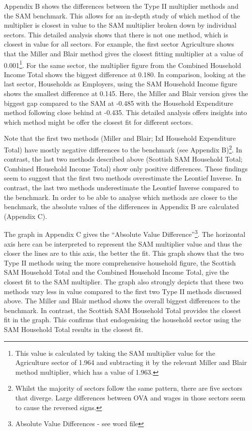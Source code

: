 \begin{doublespacing}
Appendix B shows the differences between the Type II multiplier methods and the SAM benchmark. This allows for an in-depth study of which method of the multiplier is closest in value to the SAM multiplier broken down by individual sectors. This detailed analysis shows that there is not one method, which is closest in value for all sectors. For example, the first sector Agriculture shows that the Miller and Blair \cite{Miller2009} method gives the closest fitting multiplier at a value of 0.001\footnote{This value is calculated by taking the SAM multiplier value for the Agriculture sector of 1.964 and subtracting it by the relevant Miller and Blair method multiplier, which has a value of 1.963.}. For the same sector, the multiplier figure from the Combined Household Income Total shows the biggest difference at 0.180. In comparison, looking at the last sector, Households as Employers, using the SAM Household Income figure shows the smallest difference at 0.145. Here, the Miller and Blair \cite{Miller2009} version gives the biggest gap compared to the SAM at -0.485 with the Household Expenditure method following close behind at -0.435. This detailed analysis offers insights into which method might be offer the closest fit for different sectors. 

\bigskip

Note that the first two methods (Miller and Blair; IxI Household Expenditure Total) have mostly negative differences to the benchmark (see Appendix B)\footnote{Whilst the majority of sectors follow the same pattern, there are five sectors that diverge. Large differences between OVA and wages in those sectors seem to cause the reversed signs.}. In contrast, the last two methods described above (Scottish SAM Household Total; Combined Household Income Total) show only positive differences. These findings seem to suggest that the first two methods overestimate the Leontief Inverse. In contrast, the last two methods underestimate the Leontief Inverse compared to the benchmark. In order to be able to analyse which methods are closer to the benchmark, the absolute values of the differences in Appendix B are calculated (Appendix C).

\bigskip

The graph in Appendix C gives the ``Absolute Value Difference''\footnote{Absolute Value Differences - see word file}. The horizontal axis here can be interpreted to represent the SAM multiplier value and thus the closer the lines are to this axis, the better the fit. This graph shows that the two Type II methods using the more comprehensive household figure, the Scottish SAM Household Total and the Combined Household Income Total, give the closest fit to the SAM multiplier. The graph also strongly depicts that these two methods vary less in value compared to the first two Type II methods discussed above. The Miller and Blair \cite{Miller2009} method shows the overall biggest differences to the benchmark. In contrast, the Scottish SAM Household Total provides the closest fit in the graph. This confirms that endogenising the household sector using the SAM Household Total results in the closest fit.


\end{doublespacing}
